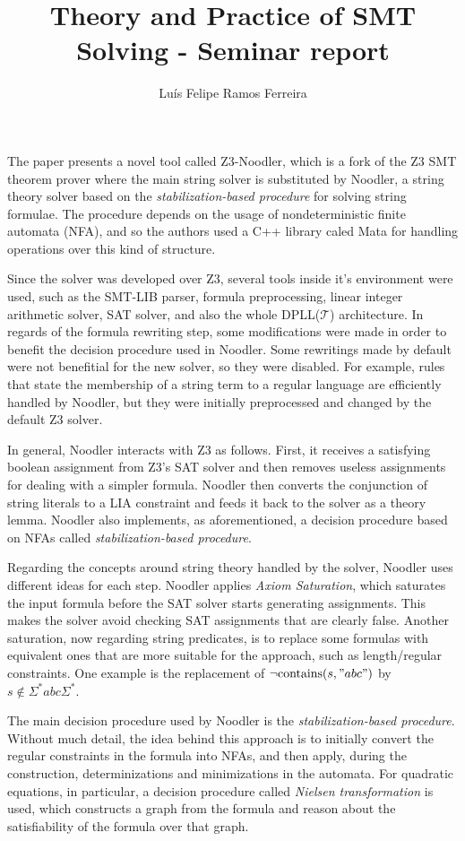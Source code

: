 \documentclass{article}
\title{Theory and Practice of SMT Solving - Seminar report}
\author{Luís Felipe Ramos Ferreira}
\date{}
\begin{document}
\maketitle

The paper presents a novel tool called Z3-Noodler, which is a fork of the Z3 SMT theorem prover where the main string solver is substituted by
Noodler, a string theory solver based on the \textit{stabilization-based procedure} for solving string formulae. The procedure depends on the usage
of nondeterministic finite automata (NFA), and so the authors used a C++ library caled Mata for handling operations over this kind of structure.

Since the solver was developed over Z3, several tools inside it's environment were used, such as the SMT-LIB parser, formula preprocessing, linear integer arithmetic
solver, SAT solver, and also the whole DPLL(\(\mathcal{T}\)) architecture. In regards of the formula rewriting step, some modifications were
made in order to benefit the decision procedure used in Noodler. Some rewritings made by default were not benefitial for the new solver, so they were disabled.
For example, rules that state the membership of a string term to a regular language are efficiently handled by Noodler, but they were initially preprocessed and changed
by the default Z3 solver.

In general, Noodler interacts with Z3 as follows. First, it receives a satisfying boolean assignment from Z3's SAT solver and then removes
useless assignments for dealing with a simpler formula. Noodler then converts the conjunction of string literals to a LIA constraint and feeds it back
to the solver as a theory lemma. Noodler also implements, as aforementioned, a decision procedure based on NFAs called \textit{stabilization-based procedure}.

Regarding the concepts around string theory handled by the solver, Noodler uses different ideas for each step. Noodler applies \textit{Axiom Saturation},
which saturates the input formula before the SAT solver starts generating assignments. This makes the solver avoid checking SAT assignments that are clearly false. Another
saturation, now regarding string predicates, is to replace some formulas with equivalent ones that are more suitable for the approach, such as length/regular
constraints. One example is the replacement of \(\neg\text{contains}(s, "abc")\) by \(s \notin \Sigma^*abc\Sigma^*\).

The main decision procedure used by Noodler is the \textit{stabilization-based procedure}. Without much detail, the idea behind this approach is to initially convert
the regular constraints in the formula into NFAs, and then apply, during the construction, determinizations and minimizations in the automata. For quadratic equations, in particular, a decision procedure
called \textit{Nielsen transformation} is used, which constructs a graph from the formula and reason about the satisfiability of the formula over that graph.
\end{document}
